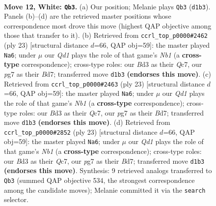 \documentclass[11pt]{article}
\begin{document}
\clearpage

\begin{figure}[p]\centering
\begin{subfigure}{0.46\textwidth}\centering
\resizebox{\linewidth}{!}{%
\newchessgame
\chessboard[
  setfen={r1b1kb1r/1pp3p1/2n5/p2q1p1p/3P4/2PB1N2/P4PPP/R1BQ1RK1 w kq - 0 12},
  showmover=false,
  pgfstyle=straightmove, color=movearrow, markmove={d1-b3}
]}
\caption{}
\end{subfigure}\hfill
\begin{subfigure}{0.46\textwidth}\centering
\resizebox{\linewidth}{!}{%
\newchessgame
\chessboard[
  setfen={rn2k1r1/ppqbnp2/4p3/3pP3/5P2/P1pQ4/2P1N1PP/R1B1KB1R b KQq - 2 12},
  showmover=false,
  pgfstyle=straightmove, color=movearrow, markmove={b8-a6}
]}
\caption{}
\end{subfigure}
\\[4pt]
\begin{subfigure}{0.46\textwidth}\centering
\resizebox{\linewidth}{!}{%
\newchessgame
\chessboard[
  setfen={rn2k1r1/ppqbnp2/4p3/3pP3/5P2/P1pQ4/2P1N1PP/R1B1KB1R b KQq - 2 12},
  showmover=false,
  pgfstyle=straightmove, color=movearrow, markmove={b8-a6}
]}
\caption{}
\end{subfigure}\hfill
\begin{subfigure}{0.46\textwidth}\centering
\resizebox{\linewidth}{!}{%
\newchessgame
\chessboard[
  setfen={rn2k1r1/ppqbnp2/4p3/3pP3/5P2/P1pQ4/2P1N1PP/R1B1KB1R b KQq - 2 12},
  showmover=false,
  pgfstyle=straightmove, color=movearrow, markmove={b8-a6}
]}
\caption{}
\end{subfigure}
\caption{\textbf{Move 12, White: \texttt{Qb3}.} (a) Our position; Melanie plays \texttt{Qb3} (\texttt{d1b3}). Panels (b)--(d) are the retrieved master positions whose correspondence most drove this move (highest QAP objective among those that transfer to it). (b) Retrieved from \texttt{ccrl\_top\_p0000\#2462} (ply 23) [structural distance $d$=66, QAP obj=59]: the master played \texttt{Na6}; under $\mu$ our \emph{Qd1} plays the role of that game's \emph{Nb1} (a \textbf{cross-type} correspondence); cross-type roles: our \emph{B}d3 as their \emph{Q}c7, our \emph{p}g7 as their \emph{B}d7; transferred move \texttt{d1b3} \textbf{(endorses this move)}. (c) Retrieved from \texttt{ccrl\_top\_p0000\#2463} (ply 23) [structural distance $d$=66, QAP obj=59]: the master played \texttt{Na6}; under $\mu$ our \emph{Qd1} plays the role of that game's \emph{Nb1} (a \textbf{cross-type} correspondence); cross-type roles: our \emph{B}d3 as their \emph{Q}c7, our \emph{p}g7 as their \emph{B}d7; transferred move \texttt{d1b3} \textbf{(endorses this move)}. (d) Retrieved from \texttt{ccrl\_top\_p0000\#2852} (ply 23) [structural distance $d$=66, QAP obj=59]: the master played \texttt{Na6}; under $\mu$ our \emph{Qd1} plays the role of that game's \emph{Nb1} (a \textbf{cross-type} correspondence); cross-type roles: our \emph{B}d3 as their \emph{Q}c7, our \emph{p}g7 as their \emph{B}d7; transferred move \texttt{d1b3} \textbf{(endorses this move)}. Synthesis: 9 retrieved analogs transferred to \texttt{Qb3} (summed QAP objective 534, the strongest correspondence among the candidate moves); Melanie committed it via the \texttt{search} selector.}
\label{fig:thought-m22}
\end{figure}
\end{document}
